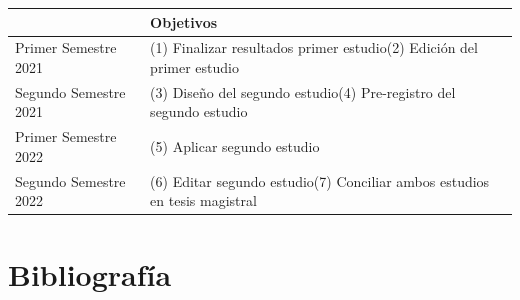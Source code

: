 \documentclass[12pt,twoside]{templates/facsothesis}
\begin{document}
\begin{longtable}[]{@{}ll@{}}
\toprule
\begin{minipage}[b]{0.21\columnwidth}\raggedright
\strut
\end{minipage} & \begin{minipage}[b]{0.73\columnwidth}\raggedright
Objetivos\strut
\end{minipage}\tabularnewline
\midrule
\endhead
\begin{minipage}[t]{0.21\columnwidth}\raggedright
Primer Semestre 2021\strut
\end{minipage} & \begin{minipage}[t]{0.73\columnwidth}\raggedright
(1) Finalizar resultados primer estudio(2) Edición del primer estudio\strut
\end{minipage}\tabularnewline
\begin{minipage}[t]{0.21\columnwidth}\raggedright
Segundo Semestre 2021\strut
\end{minipage} & \begin{minipage}[t]{0.73\columnwidth}\raggedright
(3) Diseño del segundo estudio(4) Pre-registro del segundo estudio\strut
\end{minipage}\tabularnewline
\begin{minipage}[t]{0.21\columnwidth}\raggedright
Primer Semestre 2022\strut
\end{minipage} & \begin{minipage}[t]{0.73\columnwidth}\raggedright
(5) Aplicar segundo estudio\strut
\end{minipage}\tabularnewline
\begin{minipage}[t]{0.21\columnwidth}\raggedright
Segundo Semestre 2022\strut
\end{minipage} & \begin{minipage}[t]{0.73\columnwidth}\raggedright
(6) Editar segundo estudio(7) Conciliar ambos estudios en tesis magistral\strut
\end{minipage}\tabularnewline
\bottomrule
\end{longtable}

\hypertarget{bibliografuxeda}{%
\chapter*{Bibliografía}\label{bibliografuxeda}}



\end{document}
